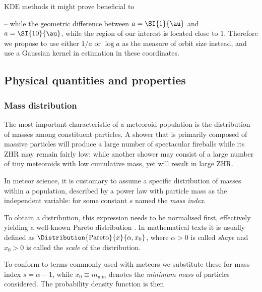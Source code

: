             KDE methods 
            it might prove beneficial to 


            -- while the geometric difference between $a = \SI{1}{\au}$ and $a = \SI{10}{\au}$,
            while the region of our interest is located close to \SI{1}{\au}.
            Therefore we propose to use either $1/a$ or $\log a$ as the measure of orbit size instead,
            and use a Gaussian kernel in estimation in these coordinates.


    \subsection{Physical quantities and properties} \label{mp}
        
        \subsubsection{Mass distribution} \label{mpam}
            The most important characteristic of a meteoroid population is the distribution of masses
            among constituent particles. A shower that is primarily composed of massive particles
            will produce a large number of spectacular fireballs while its ZHR may remain fairly low;
            while another shower may consist of a large number of tiny meteoroids with low cumulative mass,
            yet will result in large ZHR.

            In meteor science, it is customary to assume a specific distribution of masses within a population,
            described by a power law with particle mass as the independent variable:
            for some constant $s$ named the \emph{mass index}.

            To obtain a distribution, this expression needs to be normalised first,
            effectively yielding a well-known Pareto distribution \citep{arnold1983}.
            In mathematical texts it is usually defined as $\Distribution{\mathrm{Pareto}}{x}{\alpha, x_0}$,
            where $\alpha > 0$ is called \emph{shape} and $x_0 > 0$ is called the \emph{scale} of the distribution.

            To conform to terms commonly used with meteors we substitute these for mass index
            $s = \alpha - 1$, while $x_0 \equiv m_\mathrm{min}$ denotes the \emph{minimum mass}
            of particles considered. The probability density function is then

